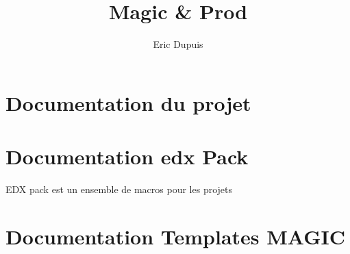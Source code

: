 

\title{Magic & Prod}
\author{Eric Dupuis}


\maketitle

\section{Documentation du projet}




\section{Documentation edx Pack}

EDX pack est un ensemble de macros pour les projets


\section{Documentation Templates MAGIC}

